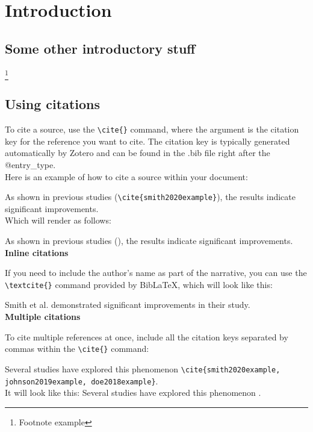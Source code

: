 \chapter{Introduction}
\lipsum[1]

\section{Some other introductory stuff}
\lipsum[2] \footnote{Footnote example}
\lipsum[4]

\section{Using citations}
To cite a source, use the \verb|\cite{}| command, where the argument is the citation key for the reference you want to cite. The citation key is typically generated automatically by Zotero and can be found in the .bib file right after the @entry\_type.\\ 

Here is an example of how to cite a source within your document:

As shown in previous studies (\verb|\cite{smith2020example}|), the results indicate significant improvements.\\

Which will render as follows:

As shown in previous studies (\cite{smith2020example}), the results indicate significant improvements.\\

\textbf{Inline citations}

If you need to include the author’s name as part of the narrative, you can use the \verb|\textcite{}| command provided by BibLaTeX, which will look like this:

Smith et al. \textcite{smith2020example} demonstrated significant improvements in their study.\\

\textbf{Multiple citations}

To cite multiple references at once, include all the citation keys separated by commas within the \verb|\cite{}| command:

Several studies have explored this phenomenon \verb|\cite{smith2020example, johnson2019example, doe2018example}|.\\

It will look like this:
Several studies have explored this phenomenon \cite{smith2020example, johnson2019example, doe2018example}.
